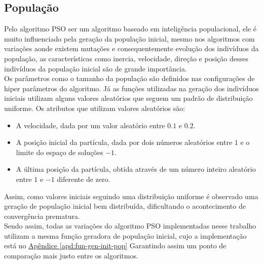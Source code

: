 \subsection{População}
Pelo algoritmo PSO ser um algoritmo baseado em inteligência populacional, ele é muito influenciado pela geração da população inicial, mesmo nos algoritmos com variações aonde existem mutações e consequentemente evolução dos indivíduos da população, as características como inercia, velocidade, direção e posição desses indivíduos da população inicial são de grande importância.\\
%
%
\indent Os parâmetros como o tamanho da população são definidos nas configurações de hiper parâmetros do algoritmo.
%
Já as funções utilizadas na geração dos indivíduos iniciais utilizam alguns valores aleatórios que seguem um padrão de distribuição uniforme. Os atributos que utilizam valores aleatórios são:
\begin{itemize}
    \item A velocidade, dada por um valor aleatório entre $0.1$ e $0.2$.
    \item A posição inicial da partícula, dada por dois números aleatórios entre $1$ e o limite do espaço de soluções $- 1$.
    \item A última posição da partícula, obtida através de um número inteiro aleatório entre $1$ e $-1$ diferente de zero.
\end{itemize}
%
%
\indent Assim, como valores iniciais seguindo uma distribuição uniforme é observado uma geração de população inicial bem distribuída, dificultando o acontecimento de convergência prematura.\\
%
%
Sendo assim, todas as variações do algoritmo PSO implementadas nesse trabalho utilizam a mesma função geradora de população inicial, cujo a implementação está no 
\hyperref[apd:fun-gen-init-pop]{Apêndice \ref{apd:fun-gen-init-pop}}
\noindent Garantindo assim um ponto de comparação mais justo entre os algoritmos.
